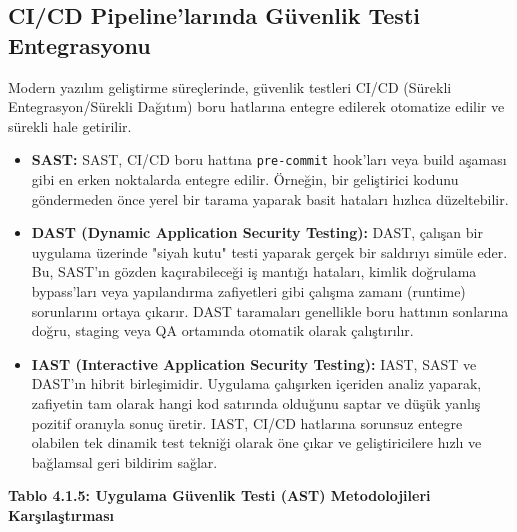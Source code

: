 \subsection{CI/CD Pipeline'larında Güvenlik Testi Entegrasyonu}
Modern yazılım geliştirme süreçlerinde, güvenlik testleri CI/CD (Sürekli Entegrasyon/Sürekli Dağıtım) boru hatlarına entegre edilerek otomatize edilir ve sürekli hale getirilir.
\begin{itemize}
\item \textbf{SAST:} SAST, CI/CD boru hattına \texttt{pre-commit} hook'ları veya build aşaması gibi en erken noktalarda entegre edilir. Örneğin, bir geliştirici kodunu göndermeden önce yerel bir tarama yaparak basit hataları hızlıca düzeltebilir.
\item \textbf{DAST (Dynamic Application Security Testing):} DAST, çalışan bir uygulama üzerinde "siyah kutu" testi yaparak gerçek bir saldırıyı simüle eder. Bu, SAST'ın gözden kaçırabileceği iş mantığı hataları, kimlik doğrulama bypass'ları veya yapılandırma zafiyetleri gibi çalışma zamanı (runtime) sorunlarını ortaya çıkarır. DAST taramaları genellikle boru hattının sonlarına doğru, staging veya QA ortamında otomatik olarak çalıştırılır.
\item \textbf{IAST (Interactive Application Security Testing):} IAST, SAST ve DAST'ın hibrit birleşimidir. Uygulama çalışırken içeriden analiz yaparak, zafiyetin tam olarak hangi kod satırında olduğunu saptar ve düşük yanlış pozitif oranıyla sonuç üretir. IAST, CI/CD hatlarına sorunsuz entegre olabilen tek dinamik test tekniği olarak öne çıkar ve geliştiricilere hızlı ve bağlamsal geri bildirim sağlar.
\end{itemize}
\textbf{Tablo 4.1.5: Uygulama Güvenlik Testi (AST) Metodolojileri Karşılaştırması}

